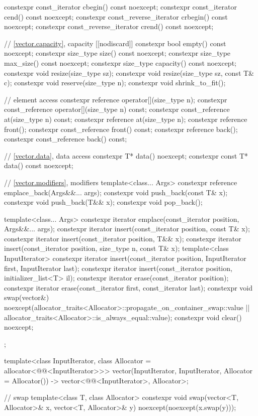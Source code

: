 \begin{codeblock}
{{    constexpr const_iterator         cbegin() const noexcept;
    constexpr const_iterator         cend() const noexcept;
    constexpr const_reverse_iterator crbegin() const noexcept;
    constexpr const_reverse_iterator crend() const noexcept;

    // \ref{vector.capacity}, capacity
    [[nodiscard]] constexpr bool empty() const noexcept;
    constexpr size_type size() const noexcept;
    constexpr size_type max_size() const noexcept;
    constexpr size_type capacity() const noexcept;
    constexpr void      resize(size_type sz);
    constexpr void      resize(size_type sz, const T& c);
    constexpr void      reserve(size_type n);
    constexpr void      shrink_to_fit();

    // element access
    constexpr reference       operator[](size_type n);
    constexpr const_reference operator[](size_type n) const;
    constexpr const_reference at(size_type n) const;
    constexpr reference       at(size_type n);
    constexpr reference       front();
    constexpr const_reference front() const;
    constexpr reference       back();
    constexpr const_reference back() const;

    // \ref{vector.data}, data access
    constexpr T*       data() noexcept;
    constexpr const T* data() const noexcept;

    // \ref{vector.modifiers}, modifiers
    template<class... Args> constexpr reference emplace_back(Args&&... args);
    constexpr void push_back(const T& x);
    constexpr void push_back(T&& x);
    constexpr void pop_back();

    template<class... Args> constexpr iterator emplace(const_iterator position, Args&&... args);
    constexpr iterator insert(const_iterator position, const T& x);
    constexpr iterator insert(const_iterator position, T&& x);
    constexpr iterator insert(const_iterator position, size_type n, const T& x);
    template<class InputIterator>
      constexpr iterator insert(const_iterator position,
                                InputIterator first, InputIterator last);
    constexpr iterator insert(const_iterator position, initializer_list<T> il);
    constexpr iterator erase(const_iterator position);
    constexpr iterator erase(const_iterator first, const_iterator last);
    constexpr void     swap(vector&)
      noexcept(allocator_traits<Allocator>::propagate_on_container_swap::value ||
               allocator_traits<Allocator>::is_always_equal::value);
    constexpr void     clear() noexcept;
  };

  template<class InputIterator, class Allocator = allocator<@@<InputIterator>>>
    vector(InputIterator, InputIterator, Allocator = Allocator())
      -> vector<@@<InputIterator>, Allocator>;

  // swap
  template<class T, class Allocator>
    constexpr void swap(vector<T, Allocator>& x, vector<T, Allocator>& y)
      noexcept(noexcept(x.swap(y)));
}
\end{codeblock}%
%

